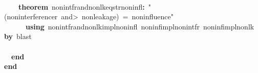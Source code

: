 \documentclass{article}
\newcommand{\syntaxKEYWORDA}[1]{\textcolor[rgb]{0.0,0.4,0.6}{\textbf{#1}}}
\newcommand{\syntaxKEYWORDB}[1]{\textcolor[rgb]{0.0,0.6,0.4}{\textbf{#1}}}
\newcommand{\syntaxLITERALA}[1]{\textcolor[rgb]{1.0,0.0,0.8}{#1}}
\newcommand{\syntaxOPERATOR}[1]{\textcolor[rgb]{0.0,0.0,0.0}{\textbf{#1}}}
\newcommand{\syntaxKEYWORDA}[1]{\textcolor[rgb]{0.0,0.4,0.6}{\textbf{#1}}}
\newcommand{\syntaxKEYWORDB}[1]{\textcolor[rgb]{0.0,0.6,0.4}{\textbf{#1}}}
\newcommand{\syntaxLITERALA}[1]{\textcolor[rgb]{1.0,0.0,0.8}{#1}}
\newcommand{\syntaxOPERATOR}[1]{\textcolor[rgb]{0.0,0.0,0.0}{\textbf{#1}}}
\newcommand{\syntaxKEYWORDA}[1]{\textcolor[rgb]{0.0,0.4,0.6}{\textbf{#1}}}
\newcommand{\syntaxKEYWORDB}[1]{\textcolor[rgb]{0.0,0.6,0.4}{\textbf{#1}}}
\newcommand{\syntaxLITERALA}[1]{\textcolor[rgb]{1.0,0.0,0.8}{#1}}
\newcommand{\syntaxOPERATOR}[1]{\textcolor[rgb]{0.0,0.0,0.0}{\textbf{#1}}}
\newcommand{\syntaxKEYWORDA}[1]{\textcolor[rgb]{0.0,0.4,0.6}{#1}}
\newcommand{\syntaxKEYWORDB}[1]{\textcolor[rgb]{0.0,0.6,0.4}{#1}}
\newcommand{\syntaxLITERALA}[1]{\textcolor[rgb]{1.0,0.0,0.8}{\textbf{#1}}}
\newcommand{\syntaxOPERATOR}[1]{\textcolor[rgb]{0.0,0.0,0.0}{#1}}
\newcommand{\syntaxKEYWORDA}[1]{\textcolor[rgb]{0.0,0.4,0.6}{\textbf{#1}}}
\newcommand{\syntaxKEYWORDB}[1]{\textcolor[rgb]{0.0,0.6,0.4}{\textbf{#1}}}
\newcommand{\syntaxLITERALA}[1]{\textcolor[rgb]{1.0,0.0,0.8}{#1}}
\newcommand{\syntaxOPERATOR}[1]{\textcolor[rgb]{0.0,0.0,0.0}{\textbf{#1}}}
\newcommand{\syntaxKEYWORDA}[1]{\textcolor[rgb]{0.0,0.4,0.6}{\textbf{#1}}}
\newcommand{\syntaxKEYWORDB}[1]{\textcolor[rgb]{0.0,0.6,0.4}{\textbf{#1}}}
\newcommand{\syntaxLITERALA}[1]{\textcolor[rgb]{1.0,0.0,0.8}{#1}}
\newcommand{\syntaxOPERATOR}[1]{\textcolor[rgb]{0.0,0.0,0.0}{\textbf{#1}}}
\begin{document}
\hspace*{\fill}\\
{\ }{\ }{\ }{\ }\syntaxKEYWORDA{theorem}{\ }nonintf\usebox{\underscorebox}r\usebox{\underscorebox}and\usebox{\underscorebox}nonlk\usebox{\underscorebox}eq\usebox{\underscorebox}strnoninfl\syntaxOPERATOR{:}{\ }\syntaxLITERALA{"(noninterference\usebox{\underscorebox}r{\ }\<and>{\ }nonleakage){\ }={\ }noninfluence"}\hspace*{\fill}\\
{\ }{\ }{\ }{\ }{\ }{\ }\syntaxKEYWORDA{using}{\ }nonintf\usebox{\underscorebox}r\usebox{\underscorebox}and\usebox{\underscorebox}nonlk\usebox{\underscorebox}impl\usebox{\underscorebox}noninfl{\ }noninf\usebox{\underscorebox}impl\usebox{\underscorebox}nonintf\usebox{\underscorebox}r{\ }noninf\usebox{\underscorebox}impl\usebox{\underscorebox}nonlk{\ }\syntaxKEYWORDA{by}{\ }blast{\ }\hspace*{\fill}\\
{\ }{\ }{\ }{\ }{\ }\hspace*{\fill}\\
{\ }{\ }\syntaxKEYWORDB{end}\hspace*{\fill}\\
\syntaxKEYWORDB{end}\hspace*{\fill}\\
\mbox{}
\normalfont
\end{document}
